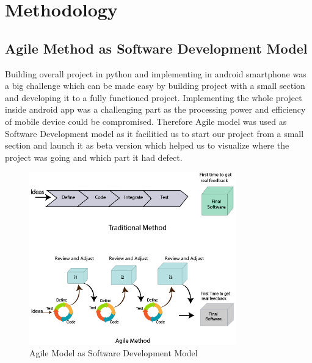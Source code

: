 \chapter{Methodology}
	\section{Agile Method as Software Development Model}
	Building overall project in python and implementing in android smartphone was a big challenge which can be made easy by building project with a small section and developing it to a fully functioned project. Implementing the whole project inside android app was a challenging part as the processing power and efficiency of mobile device could be compromised. Therefore Agile model was used as Software Development model as it facilitied us to start our project from a small section and launch it as beta version which helped us to visualize where the project was going and which part it had defect.\\
	\begin{figure}[h]
		\centering
			\includegraphics[width=0.8\textwidth]{img/agilem.png}
			\caption{Agile Model as Software Development Model}    
		\end{figure}
	\break
